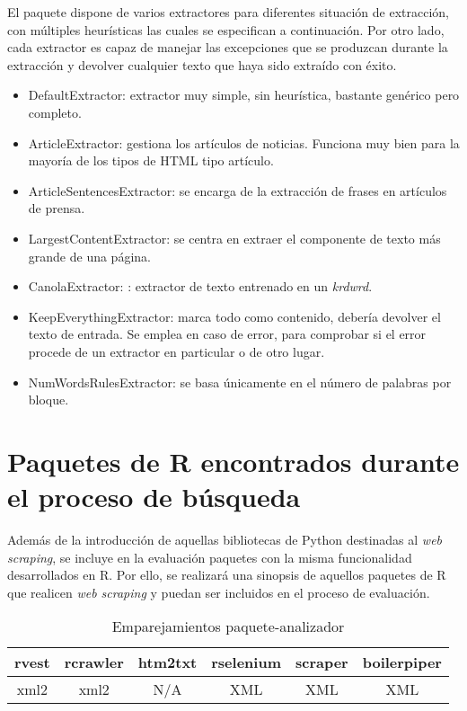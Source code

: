 El paquete dispone de varios extractores para diferentes situación de extracción, con múltiples heurísticas
las cuales se especifican a continuación. Por otro lado, cada extractor es capaz de manejar las excepciones 
que se produzcan durante la extracción y devolver cualquier texto que haya sido extraído con éxito.

\begin{itemize}
  \item DefaultExtractor: extractor muy simple, sin heurística, bastante genérico pero completo.
  \item ArticleExtractor: gestiona los artículos de noticias. Funciona muy bien para la mayoría de los 
  tipos de HTML tipo artículo.
  \item ArticleSentencesExtractor: se encarga de la extracción de frases en artículos de prensa.
  \item LargestContentExtractor: se centra en extraer el componente de texto más grande de una página. 
  \item CanolaExtractor: : extractor de texto entrenado en un \emph{krdwrd}.
  \item KeepEverythingExtractor: marca todo como contenido, debería devolver el texto de entrada. Se emplea 
  en caso de error, para comprobar si el error procede de un extractor en particular o de otro lugar.
  \item NumWordsRulesExtractor: se basa únicamente en el número de palabras por bloque.
\end{itemize}

\section{Paquetes de R encontrados durante el proceso de búsqueda}
\label{sec:paquetes de r encontrados durante el proceso de busqueda}

Además de la introducción de aquellas bibliotecas de Python destinadas al \emph{web scraping}, se incluye 
en la evaluación paquetes con la misma funcionalidad desarrollados en R. Por ello, se realizará una 
sinopsis de aquellos paquetes de R que realicen \emph{web scraping} y puedan ser incluidos en el proceso 
de evaluación.

\begin{table}[h]
  \begin{center}
  \begin{tabular}{| c | c | c | c | c | c |} \hline 
    \textbf{rvest} & \textbf{rcrawler} & \textbf{htm2txt} & \textbf{rselenium} & \textbf{scraper} & \textbf{boilerpiper} \\ \hline
    xml2 & xml2 & N/A & XML & XML & XML \\ \hline
  \end{tabular}
  \caption{Emparejamientos paquete-analizador}
  \label{tab:emparejamientos paquete-analizador}
  \end{center}
\end{table}

